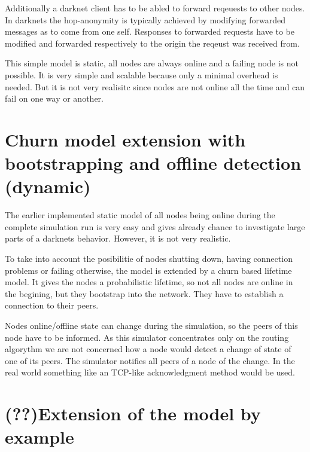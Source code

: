 Additionally a darknet client has to be abled to forward reqeuests to other nodes. In darknets the hop-anonymity is typically achieved by modifying forwarded messages as to come from one self. Responses to forwarded requests have to be modified and forwarded respectively to the origin the reqeust was received from.

This simple model is static, all nodes are always online and a failing node is not possible. It is very simple and scalable because only a minimal overhead is needed. But it is not very realisitc since nodes are not online all the time and can fail on one way or another.


\section{Churn model extension with bootstrapping and offline detection (dynamic)}

The earlier implemented static model of all nodes being online during the complete simulation run is very easy and gives already chance to investigate large parts of a darknets behavior. However, it is not very realistic.

To take into account the posibilitie of nodes shutting down, having connection problems or failing otherwise, the model is extended by a churn based lifetime model. It gives the nodes a probabilistic lifetime, so not all nodes are online in the begining, but they bootstrap into the network. They have to establish a connection to their peers.

Nodes online/offline state can change during the simulation, so the peers of this node have to be informed. As this simulator concentrates only on the routing algorythm we are not concerned how a node would detect a change of state of one of its peers. The simulator notifies all peers of a node of the change. In the real world something like an TCP-like acknowledgment method would be used. 

\section{ (??)Extension of the model by example}
